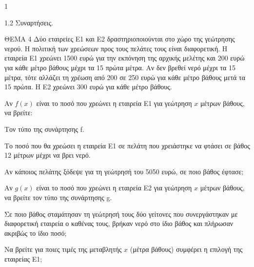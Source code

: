 \begin{ylh}{1}
    \item 1.2 Συναρτήσεις.
\end{ylh}
ΘΕΜΑ 4
Δύο εταιρείες Ε1 και Ε2 δραστηριοποιούνται στο χώρο της γεώτρησης νερού. Η πολιτική των χρεώσεων προς τους πελάτες τους είναι διαφορετική. Η εταιρεία Ε1 χρεώνει 1500 ευρώ για την εκπόνηση της αρχικής μελέτης και 200 ευρώ για κάθε μέτρο βάθους μέχρι τα 15 πρώτα μέτρα. Αν δεν βρεθεί νερό μέχρι τα 15 μέτρα, τότε αλλάζει τη χρέωση από 200 σε 250 ευρώ για κάθε μέτρο βάθους μετά τα 15 πρώτα. Η Ε2 χρεώνει 300 ευρώ για κάθε μέτρο βάθους.
\begin{alist}
\item Αν $f(x)$ είναι το ποσό που χρεώνει η εταιρεία Ε1 για γεώτρηση $x$ μέτρων βάθους, να βρείτε:
\begin{rlist}
\item Τον τύπο της συνάρτησης f. 
\item Το ποσό που θα χρεώσει η εταιρεία Ε1 σε πελάτη που χρειάστηκε να φτάσει σε βάθος 12 μέτρων μέχρι να βρει νερό. 
\item Αν κάποιος πελάτης ξόδεψε για τη γεώτρησή του 5050 ευρώ, σε ποιο βάθος έφτασε; 
\end{rlist}
\item Αν $g(x)$ είναι το ποσό που χρεώνει η εταιρεία Ε2 για γεώτρηση $x$ μέτρων βάθους, να βρείτε τον τύπο της συνάρτησης g. 
\item Σε ποιο βάθος σταμάτησαν τη γεώτρησή τους δύο γείτονες που συνεργάστηκαν με διαφορετική εταιρεία ο καθένας τους, βρήκαν νερό στο ίδιο βάθος και πλήρωσαν ακριβώς το ίδιο ποσό; 
\item Να βρείτε για ποιες τιμές της μεταβλητής $x$ (μέτρα βάθους) συμφέρει η επιλογή της εταιρείας Ε1; 
\end{alist}